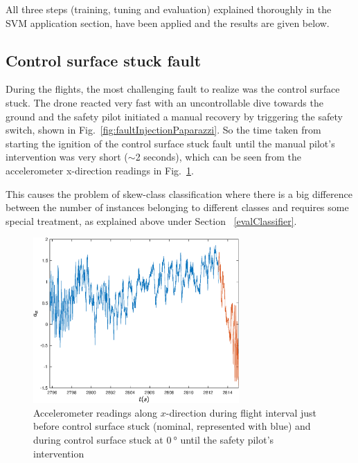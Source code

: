 All three steps (training, tuning and evaluation) explained thoroughly in the SVM application section, have been applied and the results are given below.

\subsection{Control surface stuck fault}

During the flights, the most challenging fault to realize was the control surface stuck. 
The drone reacted very fast with an uncontrollable dive towards the ground and the safety pilot initiated a manual recovery by triggering the safety switch, shown in Fig.~\ref{fig:faultInjectionPaparazzi}. 
So the time taken from starting the ignition of the control surface stuck fault until the manual pilot's intervention was very short ($\sim$2 seconds), which can be seen from the accelerometer x-direction readings in Fig.~\ref{fig:acc_x}. 

This causes the problem of skew-class classification where there is a big difference between the number of instances belonging to different classes and requires some special treatment, as explained above under Section ~\ref{evalClassifier}.

\begin{figure}[H]
\begin{center}
\includegraphics[width=0.7\textwidth]{figures/acc_x}    %
\caption{Accelerometer readings along $x$-direction during flight interval just before control surface stuck (nominal, represented with blue) and during control surface stuck at $\SI{0}{\degree}$ until the safety pilot's intervention} 
\label{fig:acc_x}
\end{center}
\end{figure}

